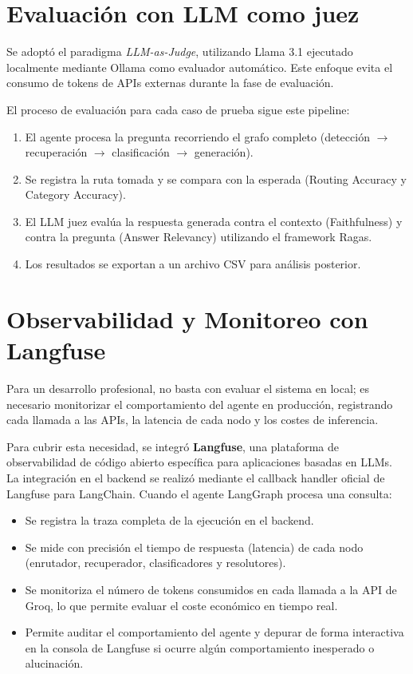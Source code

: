 \documentclass[12pt,a4paper,oneside]{report}
\begin{document}
\section{Evaluación con LLM como juez}

Se adoptó el paradigma \textit{LLM-as-Judge}, utilizando Llama 3.1 ejecutado localmente mediante Ollama como evaluador automático. Este enfoque evita el consumo de tokens de APIs externas durante la fase de evaluación.

El proceso de evaluación para cada caso de prueba sigue este pipeline:

\begin{enumerate}
    \item El agente procesa la pregunta recorriendo el grafo completo (detección $\rightarrow$ recuperación $\rightarrow$ clasificación $\rightarrow$ generación).
    \item Se registra la ruta tomada y se compara con la esperada (Routing Accuracy y Category Accuracy).
    \item El LLM juez evalúa la respuesta generada contra el contexto (Faithfulness) y contra la pregunta (Answer Relevancy) utilizando el framework Ragas.
    \item Los resultados se exportan a un archivo CSV para análisis posterior.
\end{enumerate}

\section{Observabilidad y Monitoreo con Langfuse}

Para un desarrollo profesional, no basta con evaluar el sistema en local; es necesario monitorizar el comportamiento del agente en producción, registrando cada llamada a las APIs, la latencia de cada nodo y los costes de inferencia. 

Para cubrir esta necesidad, se integró \textbf{Langfuse}, una plataforma de observabilidad de código abierto específica para aplicaciones basadas en LLMs. La integración en el backend se realizó mediante el callback handler oficial de Langfuse para LangChain. Cuando el agente LangGraph procesa una consulta:
\begin{itemize}
    \item Se registra la traza completa de la ejecución en el backend.
    \item Se mide con precisión el tiempo de respuesta (latencia) de cada nodo (enrutador, recuperador, clasificadores y resolutores).
    \item Se monitoriza el número de tokens consumidos en cada llamada a la API de Groq, lo que permite evaluar el coste económico en tiempo real.
    \item Permite auditar el comportamiento del agente y depurar de forma interactiva en la consola de Langfuse si ocurre algún comportamiento inesperado o alucinación.
\end{itemize}
\end{document}

